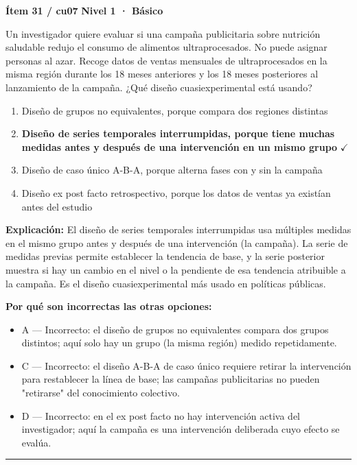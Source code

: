 \documentclass[12pt,a4paper]{article}
\begin{document}
\begin{mdframed}[backgroundcolor=fondogris,linecolor=azul,linewidth=1pt,innerleftmargin=10pt,innerrightmargin=10pt,innertopmargin=7pt,innerbottommargin=7pt]
\textbf{Ítem 31 / cu07} \hfill {\small\bfseries\color{azul} Nivel 1 · Básico}
\end{mdframed}

Un investigador quiere evaluar si una campaña publicitaria sobre nutrición saludable redujo el consumo de alimentos ultraprocesados. No puede asignar personas al azar. Recoge datos de ventas mensuales de ultraprocesados en la misma región durante los 18 meses anteriores y los 18 meses posteriores al lanzamiento de la campaña. ¿Qué diseño cuasiexperimental está usando?

\begin{enumerate}
  \item[A.] Diseño de grupos no equivalentes, porque compara dos regiones distintas
  \item[\textbf{\color{verde}B.}] \textbf{\color{verde} Diseño de series temporales interrumpidas, porque tiene muchas medidas antes y después de una intervención en un mismo grupo} \hfill $\checkmark$
  \item[C.] Diseño de caso único A-B-A, porque alterna fases con y sin la campaña
  \item[D.] Diseño ex post facto retrospectivo, porque los datos de ventas ya existían antes del estudio
\end{enumerate}

\noindent\textbf{\color{azul}Explicación:} El diseño de series temporales interrumpidas usa múltiples medidas en el mismo grupo antes y después de una intervención (la campaña). La serie de medidas previas permite establecer la tendencia de base, y la serie posterior muestra si hay un cambio en el nivel o la pendiente de esa tendencia atribuible a la campaña. Es el diseño cuasiexperimental más usado en políticas públicas.

\noindent\textbf{\color{gris}Por qué son incorrectas las otras opciones:}
\begin{itemize}
  \item {\small A — Incorrecto: el diseño de grupos no equivalentes compara dos grupos distintos; aquí solo hay un grupo (la misma región) medido repetidamente.}
  \item {\small C — Incorrecto: el diseño A-B-A de caso único requiere retirar la intervención para restablecer la línea de base; las campañas publicitarias no pueden "retirarse" del conocimiento colectivo.}
  \item {\small D — Incorrecto: en el ex post facto no hay intervención activa del investigador; aquí la campaña es una intervención deliberada cuyo efecto se evalúa.}
\end{itemize}
\vspace{8pt}\hrule\vspace{10pt}
\end{document}
